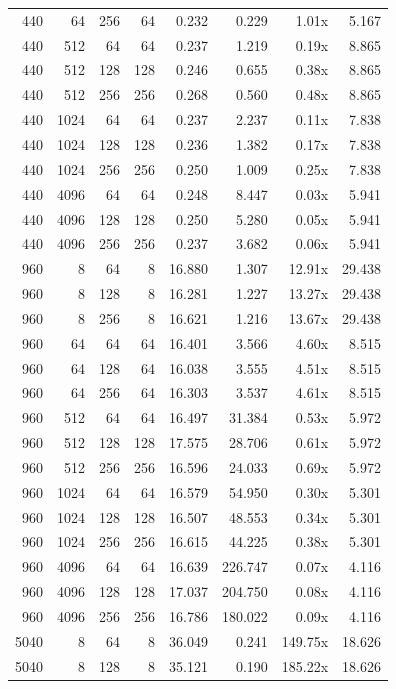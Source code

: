 {\begin{longtable}{rrrrrrrr}
440 & 64 & 256 & 64 & 0.232 & 0.229 & 1.01x & 5.167\\
440 & 512 & 64 & 64 & 0.237 & 1.219 & 0.19x & 8.865\\
440 & 512 & 128 & 128 & 0.246 & 0.655 & 0.38x & 8.865\\
440 & 512 & 256 & 256 & 0.268 & 0.560 & 0.48x & 8.865\\
440 & 1024 & 64 & 64 & 0.237 & 2.237 & 0.11x & 7.838\\
440 & 1024 & 128 & 128 & 0.236 & 1.382 & 0.17x & 7.838\\
440 & 1024 & 256 & 256 & 0.250 & 1.009 & 0.25x & 7.838\\
440 & 4096 & 64 & 64 & 0.248 & 8.447 & 0.03x & 5.941\\
440 & 4096 & 128 & 128 & 0.250 & 5.280 & 0.05x & 5.941\\
440 & 4096 & 256 & 256 & 0.237 & 3.682 & 0.06x & 5.941\\
960 & 8 & 64 & 8 & 16.880 & 1.307 & 12.91x & 29.438\\
960 & 8 & 128 & 8 & 16.281 & 1.227 & 13.27x & 29.438\\
960 & 8 & 256 & 8 & 16.621 & 1.216 & 13.67x & 29.438\\
960 & 64 & 64 & 64 & 16.401 & 3.566 & 4.60x & 8.515\\
960 & 64 & 128 & 64 & 16.038 & 3.555 & 4.51x & 8.515\\
960 & 64 & 256 & 64 & 16.303 & 3.537 & 4.61x & 8.515\\
960 & 512 & 64 & 64 & 16.497 & 31.384 & 0.53x & 5.972\\
960 & 512 & 128 & 128 & 17.575 & 28.706 & 0.61x & 5.972\\
960 & 512 & 256 & 256 & 16.596 & 24.033 & 0.69x & 5.972\\
960 & 1024 & 64 & 64 & 16.579 & 54.950 & 0.30x & 5.301\\
960 & 1024 & 128 & 128 & 16.507 & 48.553 & 0.34x & 5.301\\
960 & 1024 & 256 & 256 & 16.615 & 44.225 & 0.38x & 5.301\\
960 & 4096 & 64 & 64 & 16.639 & 226.747 & 0.07x & 4.116\\
960 & 4096 & 128 & 128 & 17.037 & 204.750 & 0.08x & 4.116\\
960 & 4096 & 256 & 256 & 16.786 & 180.022 & 0.09x & 4.116\\
5040 & 8 & 64 & 8 & 36.049 & 0.241 & 149.75x & 18.626\\
5040 & 8 & 128 & 8 & 35.121 & 0.190 & 185.22x & 18.626\\

\end{longtable}}
